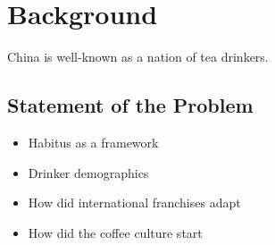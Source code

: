 \section{Background}\label{sec:background}

China is well-known as a nation of tea drinkers.

\subsection{Statement of the Problem}

\begin{itemize}
	\item Habitus as a framework
	\item Drinker demographics
	\item How did international franchises adapt
	\item How did the coffee culture start
\end{itemize}
